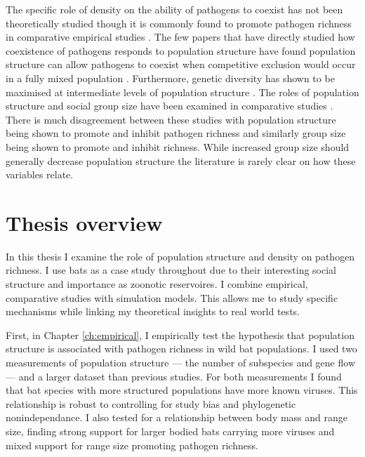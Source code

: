 The specific role of density on the ability of pathogens to coexist has not been theoretically studied though it is commonly found to promote pathogen richness in comparative empirical studies \cite{kamiya2014determines, nunn2003comparative, arneberg2002host}.
The few papers that have directly studied how coexistence of pathogens responds to population structure have found population structure can allow pathogens to coexist when competitive exclusion would occur in a fully mixed population \cite{qiu2013vector, allen2004sis, nunes2006localized}.
Furthermore, genetic diversity has shown to be maximised at intermediate levels of population structure \cite{campos2006pathogen}.
The roles of population structure and social group size have been examined in comparative studies \cite{maganga2014bat, gay2014parasite, turmelle2009correlates, altizer2003social, bordes2007rodent, ezenwa2006host, rifkin2012animals, vitone2004body}.
There is much disagreement between these studies with population structure being shown to promote \cite{maganga2014bat, turmelle2009correlates} and inhibit pathogen richness \cite{gay2014parasite} and similarly group size being shown to promote \cite{rifkin2012animals, bordes2007rodent} and inhibit \cite{ezenwa2006host} richness.
While increased group size should generally decrease population structure the literature is rarely clear on how these variables relate.




\section{Thesis overview}

In this thesis I examine the role of population structure and density on pathogen richness.
I use bats as a case study throughout due to their interesting social structure and importance as zoonotic	reservoires.
I combine empirical, comparative studies with simulation models.
This allows me to study specific mechanisms while linking my theoretical insights to real world tests.



First, in Chapter \ref{ch:empirical}, I empirically test the hypothesis that population structure is associated with pathogen richness in wild bat populations.
I used two measurements of population structure --- the number of subspecies and gene flow --- and a larger dataset than previous studies.
For both measurements I found that bat species with more structured populations have more known viruses.
This relationship is robust to controlling for study bias and phylogenetic nonindependance.
I also tested for a relationship between body mass and range size, finding strong support for larger bodied bats carrying more viruses and mixed support for range size promoting pathogen richness.

